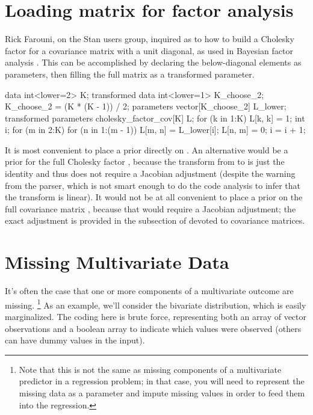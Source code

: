 \section{Loading matrix for factor analysis}

Rick Farouni, on the Stan users group, inquired as to how to build
a Cholesky factor for a covariance matrix with a unit diagonal, as
used in Bayesian factor analysis \cite{aguilar-west:2000}.  This
can be accomplished by declaring the below-diagonal elements as
parameters, then filling the full matrix as a transformed parameter.
%
\begin{stancode}
data {
  int<lower=2> K;
}
transformed data {
  int<lower=1> K_choose_2;
  K_choose_2 = (K * (K - 1)) / 2;
}
parameters {
  vector[K_choose_2] L_lower;  
}
transformed parameters {
  cholesky_factor_cov[K] L;
  for (k in 1:K)
    L[k, k] = 1;
  { 
    int i;
    for (m in 2:K) {
      for (n in 1:(m - 1)) {
        L[m, n] = L_lower[i];
        L[n, m] = 0;
        i = i + 1;
      }
    }
  }
}
\end{stancode}
%
It is most convenient to place a prior directly on .
An alternative would be a prior for the full Cholesky factor ,
because the transform from  to  is just the
identity and thus does not require a Jacobian adjustment (despite the
warning from the parser, which is not smart enough to do the code
analysis to infer that the transform is linear).  It would not be at
all convenient to place a prior on the full covariance matrix , because that would require a Jacobian adjustment; the exact
adjustment is provided in the subsection of
 devoted to covariance matrices.

\section{Missing Multivariate Data}

It's often the case that one or more components of a multivariate
outcome are missing.%
%
\footnote{Note that this is not the same as missing components of a
  multivariate predictor in a regression problem;  in that case, you
  will need to represent the missing data as a parameter and impute
  missing values in order to feed them into the regression.}
%
As an example, we'll consider the bivariate distribution, which is
easily marginalized.  The coding here is brute force, representing
both an array of vector observations  and a boolean array
 to indicate which values were observed (others can
have dummy values in the input).

